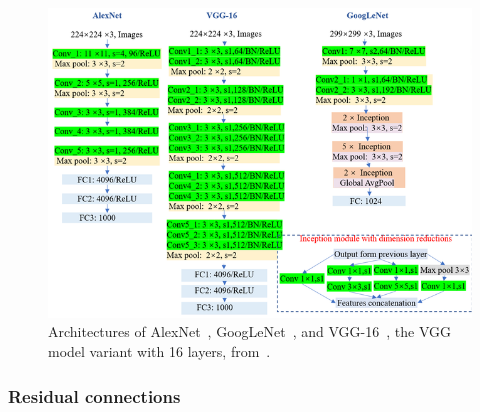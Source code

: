 \documentclass{article}
\begin{document}
\begin{figure}[h]
    \centering
    \includegraphics*[scale=0.6]{../images/famouscnns.png}
    \caption{Architectures of AlexNet~\cite{alexnet}, GoogLeNet~\cite{googlelenet}, and VGG-16~\cite{vgg}, the 
    VGG model variant with 16 layers, from~\cite{zhangImagebasedMethodsDietary2023}.}
    \label{image:famouscnns}
\end{figure}

\subsubsection{Residual connections}
\end{document}

